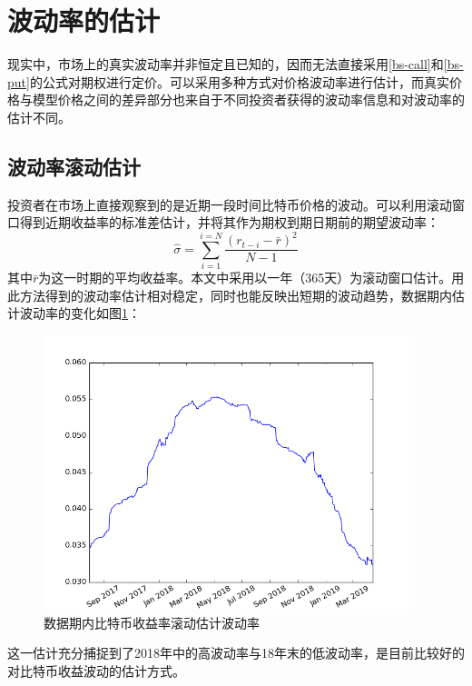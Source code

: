     \section{波动率的估计}
    现实中，市场上的真实波动率并非恒定且已知的，因而无法直接采用\ref{bs-call}和\ref{bs-put}的公式对期权进行定价。可以采用多种方式对价格波动率进行估计，而真实价格与模型价格之间的差异部分也来自于不同投资者获得的波动率信息和对波动率的估计不同。
    \subsection{波动率滚动估计}
    投资者在市场上直接观察到的是近期一段时间比特币价格的波动。可以利用滚动窗口得到近期收益率的标准差估计，并将其作为期权到期日期前的期望波动率：
    \begin{equation}\label{volatility-rolling}
        \hat{\sigma}=\sum_{i=1}^{i=N}\frac{(r_{t-i}-\bar{r})^2}{N-1}
    \end{equation}
    其中$\bar{r}$为这一时期的平均收益率。本文中采用以一年（365天）为滚动窗口估计。用此方法得到的波动率估计相对稳定，同时也能反映出短期的波动趋势，数据期内估计波动率的变化如图\ref{fig:volatility}：
    \begin{figure}[H]
        \begin{small}
            \begin{center}
                \includegraphics[width=0.95\textwidth]{figures/volatility.png}
            \end{center}
            \caption{数据期内比特币收益率滚动估计波动率}
            \label{fig:volatility}
        \end{small}
    \end{figure}
    这一估计充分捕捉到了2018年中的高波动率与18年末的低波动率，是目前比较好的对比特币收益波动的估计方式。
